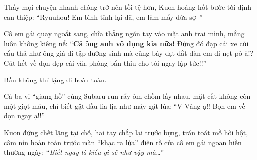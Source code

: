 \documentclass[../main.tex]{subfiles}
\begin{document}
Thấy mọi chuyện nhanh chóng trở nên tồi tệ hơn, Kuon hoảng hốt bước tới định can thiệp: ``Ryuuhou! Em bình tĩnh lại đã, em làm mấy đứa sợ--''

Cô em gái quay ngoắt sang, chĩa thẳng ngón tay vào mặt anh trai mình, mắng luôn không kiêng nể: ``\textbf{Cả ông anh vô dụng kia nữa!} Đứng đó đạp cái xe cùi cẩu thả như ông già đi tập dưỡng sinh mà cũng bày đặt dắt đàn em đi nẹt pô à!? Cút hết về dọn dẹp cái văn phòng bẩn thỉu cho tôi ngay lập tức!!''

Bầu không khí lặng đi hoàn toàn.

Cả ba vị ``giang hồ'' cùng Subaru run rẩy ôm chồm lấy nhau, mặt cắt không còn một giọt máu, chỉ biết gật đầu lia lịa như máy gặt lúa: ``V-Vâng ạ!! Bọn em về dọn ngay ạ!!''

Kuon đứng chết lặng tại chỗ, hai tay chắp lại trước bụng, trán toát mồ hôi hột, câm nín hoàn toàn trước màn ``khạc ra lửa'' điên rồ của cô em gái ngoan hiền thường ngày: ``\textit{Biết ngay là kiểu gì sẽ như vậy mà\dots}''
\end{document}
